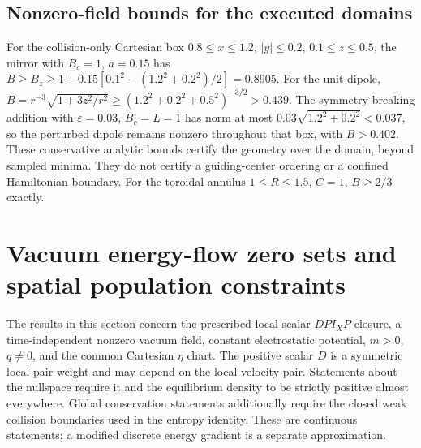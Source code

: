 \documentclass[11pt,letterpaper]{article}
\begin{document}
\subsection*{Nonzero-field bounds for the executed domains}

For the collision-only Cartesian box
$0.8\le x\le1.2$, $|y|\le0.2$, $0.1\le z\le0.5$, the mirror with $B_c=1$,
$a=0.15$ has
$B\ge B_z\ge1+0.15[0.1^2-(1.2^2+0.2^2)/2]=0.8905$.
For the unit dipole,
$B=r^{-3}\sqrt{1+3z^2/r^2}\ge(1.2^2+0.2^2+0.5^2)^{-3/2}>0.439$.
The symmetry-breaking addition with $\varepsilon=0.03$, $B_c=L=1$ has norm
at most $0.03\sqrt{1.2^2+0.2^2}<0.037$, so the perturbed dipole remains
nonzero throughout that box, with $B>0.402$. These conservative analytic bounds
certify the geometry over the domain, beyond sampled minima. They do not
certify a guiding-center ordering or a confined Hamiltonian boundary.
For the toroidal annulus $1\le R\le1.5$, $C=1$, $B\ge2/3$ exactly.

\section{Vacuum energy-flow zero sets and spatial population constraints}

The results in this section concern the prescribed local scalar
$D P I_XP$ closure, a time-independent nonzero vacuum field, constant
electrostatic potential, $m>0$, $q\ne0$, and the common Cartesian $\eta$ chart.
The positive scalar $D$ is a symmetric local pair weight and may depend on the local
velocity pair. Statements about
the nullspace require it and the equilibrium density to be strictly positive
almost everywhere. Global conservation statements additionally require the
closed weak collision boundaries used in the entropy identity. These are
continuous statements; a modified discrete energy gradient is a separate
approximation.
\end{document}
